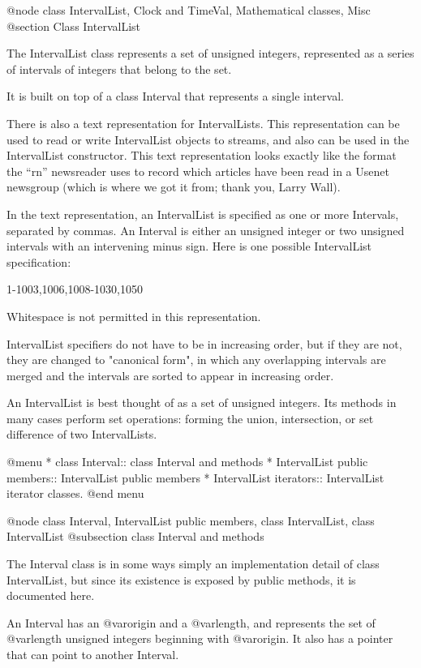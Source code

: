 @node class IntervalList, Clock and TimeVal, Mathematical classes, Misc
@section Class IntervalList

The IntervalList class represents a set of unsigned integers, represented
as a series of intervals of integers that belong to the set.

It is built on top of a class Interval that represents a single
interval.

There is also a text representation for IntervalLists.  This
representation can be used to read or write IntervalList objects
to streams, and also can be used in the IntervalList constructor.
This text representation looks exactly like the format the ``rn''
newsreader uses to record which articles have been read in a
Usenet newsgroup (which is where we got it from; thank you, Larry
Wall).

In the text representation, an IntervalList is specified as one
or more Intervals, separated by commas.  An Interval is either
an unsigned integer or two unsigned intervals with an intervening
minus sign.  Here is one possible IntervalList specification:

1-1003,1006,1008-1030,1050

Whitespace is not permitted in this representation.

IntervalList specifiers do not have to be in increasing order,
but if they are not, they are changed to "canonical form", in which
any overlapping intervals are merged and the intervals are sorted
to appear in increasing order.

An IntervalList is best thought of as a set of unsigned integers.
Its methods in many cases perform set operations: forming the
union, intersection, or set difference of two IntervalLists.

@menu
* class Interval::              class Interval and methods
* IntervalList public members::  IntervalList public members
* IntervalList iterators::      IntervalList iterator classes.
@end menu

@node class Interval, IntervalList public members, class IntervalList, class IntervalList
@subsection class Interval and methods

The Interval class is in some ways simply an implementation detail of
class IntervalList, but since its existence is exposed by public
methods, it is documented here.

An Interval has an @var{origin} and a @var{length}, and represents the
set of @var{length} unsigned integers beginning with @var{origin}.  It
also has a pointer that can point to another Interval.

